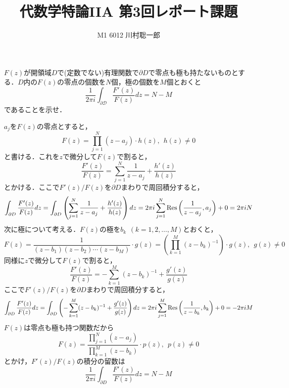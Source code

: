 \documentclass[dvipdfmx]{jsreport}
\title{代数学特論IIA 第3回レポート課題}
\author{M1 6012 川村聡一郎}
\date{}
\begin{document}
\maketitle

\begin{tcolorbox}
	$F(z)$が開領域$D$で(定数でない)有理関数で$\partial D$で零点も極も持たないものとする．$D$内の$F(z)$の零点の個数を$N$個，極の個数を$M$個とおくと
\begin{equation*}
	\frac{1}{2\pi i}\int_{\partial\mathcal{D}}\frac{F'(z)}{F(z)}dz= N- M
\end{equation*}
	であることを示せ．
\end{tcolorbox}

\begin{souanswer} %
	$a_j$を$F(z)$の零点とすると，
\begin{equation}
	F(z)= \prod_{j= 1}^N (z- a_j)\cdot h(z),\ \ h(z)\ne 0
\end{equation}
	と書ける．これを$z$で微分して$F(z)$で割ると，
\begin{equation}
	\frac{F'(z)}{F(z)}= \sum_{j= 1}^N \frac{1}{z- a_j}+ \frac{h'(z)}{h(z)}
\end{equation}
	とかける．ここで$F'(z)/ F(z)$を$\partial D$まわりで周回積分すると，
\begin{equation}
	\int_{\partial D}\frac{F'(z)}{F(z)}dz
	= \int_{\partial D}\left(\sum_{j= 1}^N \frac{1}{z- a_j}+ \frac{h'(z)}{h(z)}\right)dz
	= 2\pi i\sum_{j= 1}^N \operatorname{Res}{\left(\frac{1}{z- a_j}, a_j\right)}+ 0
	= 2\pi iN
\end{equation}
	次に極について考える．$F(z)$の極を$b_k\ \ (k= 1, 2, \ldots, M)$とおくと，
\begin{equation}
	F(z)= \frac{1}{(z- b_1)(z- b_2)\cdots (z- b_M)}\cdot g(z)= \left(\prod_{k= 1}^M (z- b_k)^{-1}\right)\cdot g(z),\ \ g(z)\ne 0
\end{equation}
	同様に$z$で微分して$F(z)$で割ると，
\begin{equation}
	\frac{F'(z)}{F(z)}= -\sum_{k= 1}^M (z- b_k)^{-1}+ \frac{g'(z)}{g(z)}
\end{equation}
ここで$F'(z)/ F(z)$を$\partial D$まわりで周回積分すると，
\begin{equation}
	\int_{\partial D}\frac{F'(z)}{F(z)}dz
	= \int_{\partial D}\left(-\sum_{k= 1}^M (z- b_k)^{-1}+ \frac{g'(z)}{g(z)}\right)dz
	= 2\pi i\sum_{j= 1}^M \operatorname{Res}{\left(\frac{1}{z- b_k}, b_k\right)}+ 0
	= -2\pi iM
\end{equation}
	$F(z)$は零点も極も持つ関数だから
\begin{equation}
	F(z)= \frac{\displaystyle \prod_{j= 1}^N (z- a_j)}{\displaystyle \prod_{k= 1}^M (z- b_k)}\cdot p(z),\ \ p(z)\ne 0
\end{equation}
	とかけ，$F'(z)/F(z)$の積分の留数は
\begin{equation}
	\frac{1}{2\pi i}\int_{\partial D} \frac{F'(z)}{F(z)}dz
	= N- M
\end{equation}
\end{souanswer}
\end{document}
